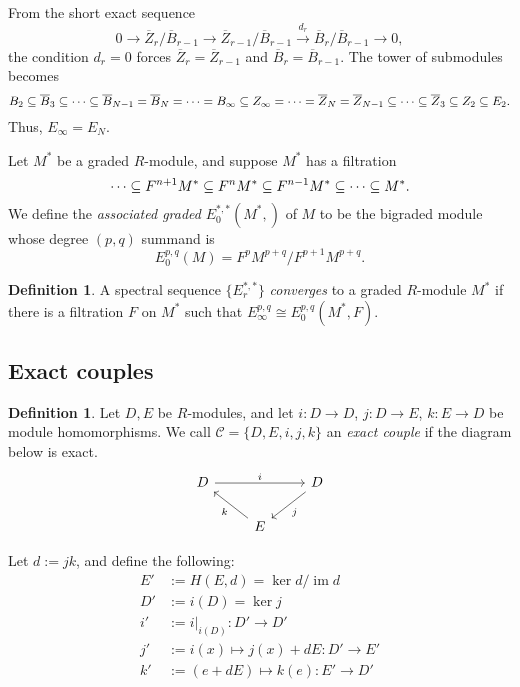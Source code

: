 \documentclass[11pt, titlepage]{article} %
\def\subq{\ensuremath\subseteq}
\DeclareMathOperator{\im}{im}
\numberwithin{equation}{subsection}
\theoremstyle{plain}
\theoremstyle{definition}
\newtheorem{definition}[theorem]{Definition}
\begin{document}
From the short exact sequence 
\[0 \to \overline Z_{r}/\overline B_{r-1}\to \overline Z_{r-1}/\overline B_{r-1} \xrightarrow{d_{r}} \overline B_{r}/\overline{B}_{r-1}\to 0,\]
the condition \(d_r=0\) forces  \(\overline{Z}_r=\overline{Z}_{r-1}\) and \(\overline{B}_r=\overline{B}_{r-1}\). The tower of submodules becomes
\[B_2\subq \overline B_3\subq \cdots \subq \overline B_{N-1}=\overline B_N= \cdots=B_\infty \subq Z_\infty= \cdots = \overline Z_N=\overline Z_{N-1}\subq \cdots \subq \overline Z_3\subq Z_2\subq E_2.\]
Thus, \(E_\infty=E_N\). 

Let \(M^*\) be a graded \(R\)-module, and suppose \(M^*\) has a filtration
\[\cdots \subq F^{n+1}M^*\subq F^nM^* \subq F^{n-1}M^*\subq \cdots \subq M^*.\]
We define the \textit{associated graded} \(E^{*,*}_0(M^*, )\) of \(M\) to be the bigraded module whose degree \((p,q)\) summand is
\[E^{p,q}_0(M)= F^pM^{p+q}/F^{p+1}M^{p+q}.\]

\begin{definition}\label{2504291808}
A spectral sequence \(\{E_r^{*,*}\}\) \textit{converges} to a graded \(R\)-module \(M^*\) if there is a filtration \(F\) on \(M^*\) such that \(E_\infty^{p,q}\cong E^{p,q}_0(M^*, F)\).
\end{definition}

\subsection{Exact couples}\label{2503301333}

\begin{definition}
Let \(D, E\) be \(R\)-modules, and let \(i : D \to D\), \(j : D\to E\), \(k : E \to D\) be module homomorphisms. We call \(\mathcal{C}=\{D, E, i, j, k\}\) an \textit{exact couple} if the diagram below is exact.
\[\begin{tikzcd}
 D \arrow[rr, "i"] && D \arrow[dl, "j"] \\ 
  & E \arrow[ul, "k"] &  
 \end{tikzcd}\] 
\end{definition}

Let \(d:=jk\), and define the following:
\begin{align*}
E'&:=H(E, d)=\ker d/\im d\\
D'&:=i(D)=\ker j\\
i'&:=i|_{i(D)} : D'\to D'\\
j'&:=i(x)\mapsto j(x)+dE : D'\to E'\\
k'&:=(e+dE)\mapsto k(e) : E' \to D'
\end{align*}
\end{document}
